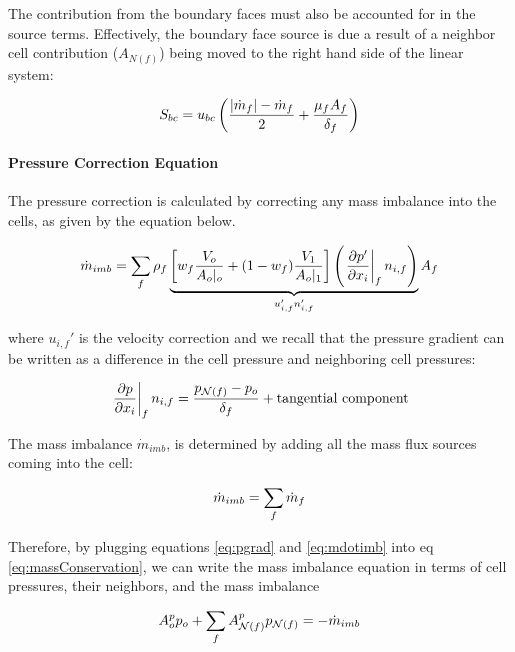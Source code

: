 The contribution from the boundary faces must also be accounted for in the source terms. Effectively, the boundary face source is due a result of a neighbor cell contribution ($A_{N(f)}$) being moved to the right hand side of the linear system:

\begin{equation}
S_{bc} = u_{bc} \left( \frac{|\dot{m}_f| - \dot{m}_f}{2} + \frac{\mu_f A_f}{\delta_f} \right)
\end{equation}





\paragraph{Pressure Correction Equation}


The pressure correction is calculated by correcting any mass imbalance into the cells, as given by the equation below. 

\begin{equation}
\dot{m}_{imb} = \sum_f \rho_f \underbrace{ \left[ w_f \frac{V_o}{A_o\rvert_o} + (1-w_f) \frac{V_1}{A_o \rvert_1} \right] \left( \left.\pdv{p'}{x_i}\right|_f n_{i,f} \right)}_{ u_{i,f}' n_{i,f}'} A_f \label{eq:massConservation}
\end{equation}

\noindent where $u_{i,f}'$ is the velocity correction and we recall that the pressure gradient can be written as a difference in the cell pressure and neighboring cell pressures:

\begin{equation}
\left.\pdv{p}{x_i}\right|_f n_{i,f} =  \frac{p_{\mathcal{N}(f)} - p_o}{\delta_f} + \text{tangential component} \label{eq:pgrad}
\end{equation}

The mass imbalance $\dot{m}_{imb}$, is determined by adding all the mass flux sources coming into the cell:

\begin{equation}
\dot{m}_{imb} = \sum_{f} \dot{m}_f \label{eq:mdotimb}
\end{equation}

Therefore, by plugging equations \ref{eq:pgrad} and \ref{eq:mdotimb} into eq \ref{eq:massConservation}, we can write the mass imbalance equation in terms of cell pressures, their neighbors, and the mass imbalance


\begin{equation}
A_o^p p_o + \sum_{f} A_{\mathcal{N}(f)}^p p_{\mathcal{N}(f)} = -\dot{m}_{imb}
\end{equation}

